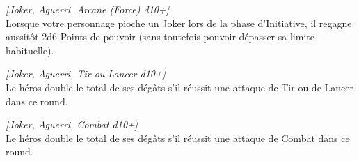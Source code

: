 \begin{description}[align=left]
    \item [Afflux de pouvoir]
        \emph{[Joker, Aguerri, Arcane (Force) d10+]}\\
        Lorsque votre personnage pioche un Joker lors de la phase d’Initiative, il regagne aussitôt 2d6 Points de pouvoir (sans toutefois pouvoir dépasser sa limite habituelle).

    \item [Dans le mille !]
        \emph{[Joker, Aguerri, Tir ou Lancer d10+]}\\
        Le héros double le total de ses dégâts s’il réussit une attaque de Tir ou de Lancer dans ce round.

    \item [Coup puissant]
        \emph{[Joker, Aguerri, Combat d10+]}\\
        Le héros double le total de ses dégâts s’il réussit une attaque de Combat dans ce round.

\end{description}